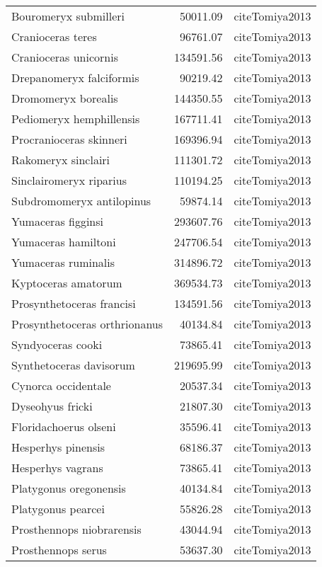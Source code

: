 \begin{table}[ht]
\begin{tabular}{lrl}
  Bouromeryx submilleri & 50011.09 & cite{Tomiya2013} \\ 
  Cranioceras teres & 96761.07 & cite{Tomiya2013} \\ 
  Cranioceras unicornis & 134591.56 & cite{Tomiya2013} \\ 
  Drepanomeryx falciformis & 90219.42 & cite{Tomiya2013} \\ 
  Dromomeryx borealis & 144350.55 & cite{Tomiya2013} \\ 
  Pediomeryx hemphillensis & 167711.41 & cite{Tomiya2013} \\ 
  Procranioceras skinneri & 169396.94 & cite{Tomiya2013} \\ 
  Rakomeryx sinclairi & 111301.72 & cite{Tomiya2013} \\ 
  Sinclairomeryx riparius & 110194.25 & cite{Tomiya2013} \\ 
  Subdromomeryx antilopinus & 59874.14 & cite{Tomiya2013} \\ 
  Yumaceras figginsi & 293607.76 & cite{Tomiya2013} \\ 
  Yumaceras hamiltoni & 247706.54 & cite{Tomiya2013} \\ 
  Yumaceras ruminalis & 314896.72 & cite{Tomiya2013} \\ 
  Kyptoceras amatorum & 369534.73 & cite{Tomiya2013} \\ 
  Prosynthetoceras francisi & 134591.56 & cite{Tomiya2013} \\ 
  Prosynthetoceras orthrionanus & 40134.84 & cite{Tomiya2013} \\ 
  Syndyoceras cooki & 73865.41 & cite{Tomiya2013} \\ 
  Synthetoceras davisorum & 219695.99 & cite{Tomiya2013} \\ 
  Cynorca occidentale & 20537.34 & cite{Tomiya2013} \\ 
  Dyseohyus fricki & 21807.30 & cite{Tomiya2013} \\ 
  Floridachoerus olseni & 35596.41 & cite{Tomiya2013} \\ 
  Hesperhys pinensis & 68186.37 & cite{Tomiya2013} \\ 
  Hesperhys vagrans & 73865.41 & cite{Tomiya2013} \\ 
  Platygonus oregonensis & 40134.84 & cite{Tomiya2013} \\ 
  Platygonus pearcei & 55826.28 & cite{Tomiya2013} \\ 
  Prosthennops niobrarensis & 43044.94 & cite{Tomiya2013} \\ 
  Prosthennops serus & 53637.30 & cite{Tomiya2013} \\ 

\end{tabular}
\end{table}
